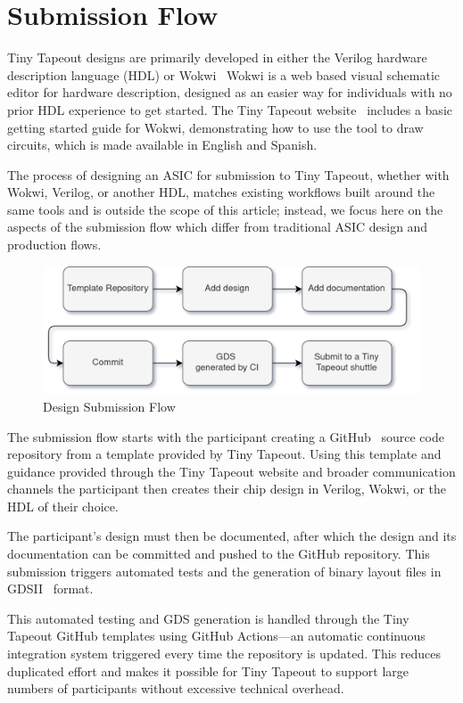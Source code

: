 \section{Submission Flow}
\label{sec:design_flow}

Tiny Tapeout designs are primarily developed in either the Verilog hardware description language (HDL) or Wokwi~\cite{wokwi}
Wokwi is a web based visual schematic editor for hardware description, designed as an easier way for individuals with no prior HDL experience to get started.
The Tiny Tapeout website~\cite{tinytapeout} includes a basic getting started guide for Wokwi, demonstrating how to use the tool to draw circuits, which is made available in English and Spanish.

The process of designing an ASIC for submission to Tiny Tapeout, whether with Wokwi, Verilog, or another HDL, matches existing workflows built around the same tools and is outside the scope of this article; instead, we focus here on the aspects of the submission flow which differ from traditional ASIC design and production flows.

\begin{figure}[!t]
\centering
\includegraphics[width=\columnwidth]{./Figs/submission_flow.png}
\caption{Design Submission Flow}
\label{fig:submission_flow}
\end{figure}

The submission flow starts with the participant creating a GitHub~\cite{github} source code repository from a template provided by Tiny Tapeout. Using this template and guidance provided through the Tiny Tapeout website and broader communication channels the participant then creates their chip design in Verilog, Wokwi, or the HDL of their choice.

The participant's design must then be documented, after which the design and its documentation can be committed and pushed to the GitHub repository. This submission triggers automated tests and the generation of binary layout files in GDSII~\cite{gds} format.

This automated testing and GDS generation is handled through the Tiny Tapeout GitHub templates\cite{verilogtemplate} using GitHub Actions\cite{githubactions}---an automatic continuous integration system triggered every time the repository is updated. This reduces duplicated effort and makes it possible for Tiny Tapeout to support large numbers of participants without excessive technical overhead.

